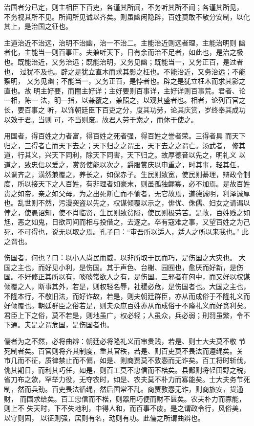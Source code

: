 \documentclass[]{article}
\begin{document}
治国者分已定，则主相臣下百吏，各谨其所闻，不务听其所不闻；各谨其所见，
不务视其所不见。所闻所见诚以齐矣。则虽幽闲隐辟，百姓莫敢不敬分安制，以化
其上，是治国之征也。

主道治近不治远，治明不治幽，治一不治二。主能治近则远者理，主能治明则
幽者化，主能当一则百事正。夫兼听天下，日有余而治不足者，如此也，是治之极
也。既能治近，又务治远；既能治明，又务见幽；既能当一，又务正百，是过者也，
过犹不及也。辟之是犹立直木而求其影之枉也。不能治近，又务治远；不能察明，
又务见幽；不能当一，又务正百，是悖者也。辟之是犹立枉木而求其影之直也。故
明主好要，而闇主好详；主好要则百事详，主好详则百事荒。君者、论一相，陈一
法，明一指，以兼覆之，兼照之，以观其盛者也。相者，论列百官之长，要百事之
听，以饰朝廷臣下百吏之分，度其功劳，论其庆赏，岁终奉其成功以效于君。当则
可，不当则废。故君人劳于索之，而休于使之。

用国者，得百姓之力者富，得百姓之死者强，得百姓之誉者荣。三得者具
而天下归之，三得者亡而天下去之；天下归之之谓王，天下去之之谓亡。汤武者，
修其道，行其义，兴天下同利，除天下同害，天下归之。故厚德音以先之，明礼义
以道之，致忠信以爱之，赏贤使能以次之，爵服赏庆以申重之，时其事，轻其任，
以调齐之，潢然兼覆之，养长之，如保赤子。生民则致宽，使民则綦理，辩政令制
度，所以接天下之人百姓，有非理者如豪末，则虽孤独鳏寡，必不加焉。是故百姓
贵之如帝，亲之如父母，为之出死断亡而不愉者，无它故焉，道德诚明，利泽诚厚
也。乱世则不然，污漫突盗以先之，权谋倾覆以示之，俳优、侏儒、妇女之请谒以
悖之，使愚诏知，使不肖临贤，生民则致贫隘，使民则极劳苦。是故，百姓贱之如
尪，恶之如鬼，日欲司间而相与投借之，去逐之。卒有寇难之事，又望百姓之为己
死，不可得也，说无以取之焉。孔子曰：``审吾所以适人，适人之所以来我也。''
此之谓也。

伤国者，何也？曰：以小人尚民而威，以非所取于民而巧，是伤国之大灾也。
大国之主也，而好见小利，是伤国。其于声色、台榭、园囿也，愈厌而好新，是伤
国。不好修正其所以有，啖啖常欲人之有，是伤国。三邪者在匈中，而又好以权谋
倾覆之人，断事其外，若是，则权轻名辱，社稷必危，是伤国者也。大国之主也，
不隆本行，不敬旧法，而好诈故，若是，则夫朝廷群臣，亦从而成俗于不隆礼义而
好倾覆也。朝廷群臣之俗若是，则夫众庶百姓亦从而成俗于不隆礼义而好贪利矣。
君臣上下之俗，莫不若是，则地虽广，权必轻；人虽众，兵必弱；刑罚虽繁，令不
下通。夫是之谓危国，是伤国者也。

儒者为之不然，必将曲辨：朝廷必将隆礼义而审贵贱，若是、则士大夫莫不敬
节死制者矣。百官则将齐其制度，重其官秩，若是、则百吏莫不畏法而遵绳矣。关
市几而不征，质律禁止而不偏，如是、则商贾莫不敦悫而无诈矣。百工将时斩伐，
佻其期日，而利其巧任，如是，则百工莫不忠信而不楛矣。县鄙则将轻田野之税，
省刀布之歛，罕举力役，无夺农时，如是、农夫莫不朴力而寡能矣。士大夫务节死
制，然而兵劲。百吏畏法循绳，然后国常不乱。商贾敦悫无诈，则商旅安，货通财，
而国求给矣。百工忠信而不楛，则器用巧便而财不匮矣。农夫朴力而寡能，则上不
失天时，下不失地利，中得人和，而百事不废。是之谓政令行，风俗美，以守则固，
以征则强，居则有名，动则有功。此儒之所谓曲辨也。
\end{document}
